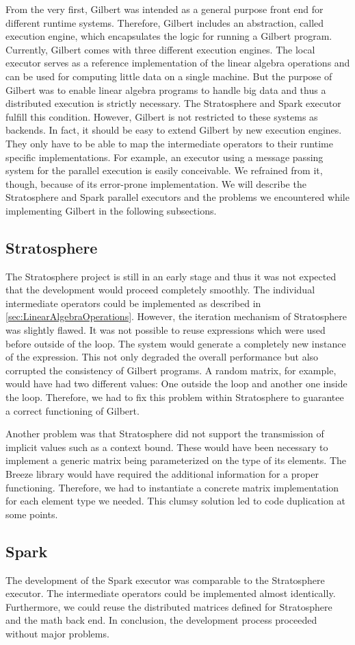 From the very first, Gilbert was intended as a general purpose front end for different runtime systems.
Therefore, Gilbert includes an abstraction, called execution engine, which encapsulates the logic for running a Gilbert program.
Currently, Gilbert comes with three different execution engines.
The local executor serves as a reference implementation of the linear algebra operations and can be used for computing little data on a single machine.
But the purpose of Gilbert was to enable linear algebra programs to handle big data and thus a distributed execution is strictly necessary.
The Stratosphere and Spark executor fulfill this condition.
However, Gilbert is not restricted to these systems as backends.
In fact, it should be easy to extend Gilbert by new execution engines.
They only have to be able to map the intermediate operators to their runtime specific implementations.
For example, an executor using a message passing system for the parallel execution is easily conceivable.
We refrained from it, though, because of its error-prone implementation.
We will describe the Stratosphere and Spark parallel executors and the problems we encountered while implementing Gilbert in the following subsections.

\subsection{Stratosphere}

The Stratosphere project is still in an early stage and thus it was not expected that the development would proceed completely smoothly.
The individual intermediate operators could be implemented as described in \cref{sec:LinearAlgebraOperations}.
However, the iteration mechanism of Stratosphere was slightly flawed.
It was not possible to reuse expressions which were used before outside of the loop.
The system would generate a completely new instance of the expression.
This not only degraded the overall performance but also corrupted the consistency of Gilbert programs.
A random matrix, for example, would have had two different values: One outside the loop and another one inside the loop.
Therefore, we had to fix this problem within Stratosphere to guarantee a correct functioning of Gilbert.

Another problem was that Stratosphere did not support the transmission of implicit values such as a context bound.
These would have been necessary to implement a generic matrix being parameterized on the type of its elements.
The Breeze library would have required the additional information for a proper functioning.
Therefore, we had to instantiate a concrete matrix implementation for each element type we needed.
This clumsy solution led to code duplication at some points.

\subsection{Spark}

The development of the Spark executor was comparable to the Stratosphere executor.
The intermediate operators could be implemented almost identically.
Furthermore, we could reuse the distributed matrices defined for Stratosphere and the math back end.
In conclusion, the development process proceeded without major problems. 
